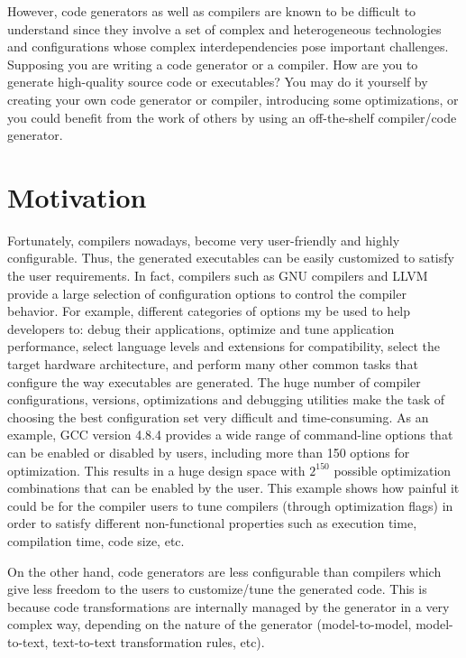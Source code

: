 However, code generators as well as compilers are known to be difficult to understand since they involve a set of complex and heterogeneous technologies and configurations whose complex interdependencies pose important challenges. 
Supposing you are writing a code generator or a compiler. How are you to generate high-quality source code or executables? You may do it yourself by creating your own code generator or compiler, introducing some optimizations, or you could benefit from the work of others by using an off-the-shelf compiler/code generator.


\section{Motivation}

Fortunately, compilers nowadays, become very user-friendly and highly configurable\cite{fursin2008milepost}. Thus, the generated executables can be easily customized to satisfy the user requirements. In fact, compilers such as GNU compilers and LLVM provide a large selection of configuration options to control the compiler behavior. For example, different categories of options my be used to help developers to: debug their applications, optimize and tune application performance, select language levels and extensions for compatibility, select the target hardware architecture, and perform many other common tasks that configure the way executables are generated.
The huge number of compiler configurations, versions, optimizations and debugging utilities make the task of choosing the best configuration set very difficult and time-consuming. As an example, GCC version 4.8.4 provides a wide range of command-line options that can be enabled or disabled by users, including more than 150 options for optimization. This results in a huge design space with $2^{150}$ possible optimization combinations that can be enabled by the user.
This example shows how painful it could be for the compiler users to tune compilers (through optimization flags) in order to satisfy different non-functional properties such as execution time, compilation time, code size, etc.

On the other hand, code generators are less configurable than compilers which give less freedom to the users to customize/tune the generated code. This is because code transformations are internally managed by the generator in a very complex way, depending on the nature of the generator (model-to-model, model-to-text, text-to-text transformation rules, etc).

